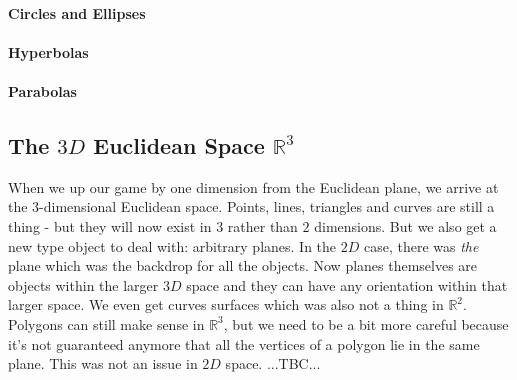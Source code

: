 


\paragraph{Circles and Ellipses}

\paragraph{Hyperbolas}

\paragraph{Parabolas}






\subsection{The $3D$ Euclidean Space $\mathbb{R}^3$}
When we up our game by one dimension from the Euclidean plane, we arrive at the $3$-dimensional Euclidean space. Points, lines, triangles and curves are still a thing - but they will now exist in $3$ rather than $2$ dimensions. But we also get a new type object to deal with: arbitrary planes. In the $2D$ case, there was \emph{the} plane which was the backdrop for all the objects. Now planes themselves are objects within the larger $3D$ space and they can have any orientation within that larger space. We even get curves surfaces which was also not a thing in $\mathbb{R}^2$. Polygons can still make sense in $\mathbb{R}^3$, but we need to be a bit more careful because it's not guaranteed anymore that all the vertices of a polygon lie in the same plane. This was not an issue in $2D$ space. ...TBC...



